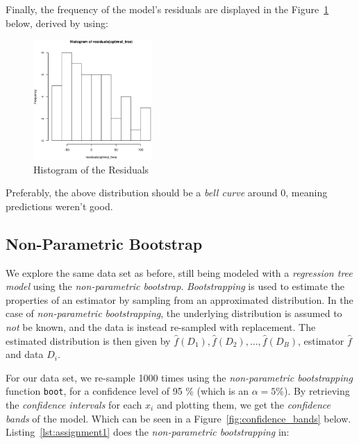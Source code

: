 \documentclass[a4paper, twocolumn]{article}
\begin{document}
        Finally, the frequency of the model's residuals are displayed in the Figure~\ref{fig:residuals} below, derived by using:

        

        \begin{figure}[h!]
            \centering
            \caption{Histogram of the Residuals}
            \label{fig:residuals}
            \includegraphics[width=0.4\textwidth]{share/A1_historgram_residuals.eps}
        \end{figure}

        Preferably, the above distribution should be a \emph{bell curve} around 0, meaning predictions weren't good.

    \subsection*{Non-Parametric Bootstrap}

        We explore the same data set as before, still being modeled with a \emph{regression tree model} using the \emph{non-parametric bootstrap}. \emph{Bootstrapping} is used to estimate the properties of an estimator by sampling from an approximated distribution. In the case of \emph{non-parametric bootstrapping}, the underlying distribution is assumed to \emph{not} be known, and the data is instead re-sampled with replacement. The estimated distribution is then given by $\hat{f}(D_1), \hat{f}(D_2), ..., \hat{f}(D_B)$, estimator $\hat{f}$ and data $D_i$.

        For our data set, we re-sample 1000 times using the \emph{non-parametric bootstrapping} function \texttt{boot}, for a confidence level of 95 \% (which is an $\alpha = 5\%$). By retrieving the \emph{confidence intervals} for each $x_i$ and plotting them, we get the \emph{confidence bands} of the model. Which can be seen in a Figure~\ref{fig:confidence_bands} below. Listing~\ref{lst:assignment1} does the \emph{non-parametric bootstrapping} in:
\end{document}
